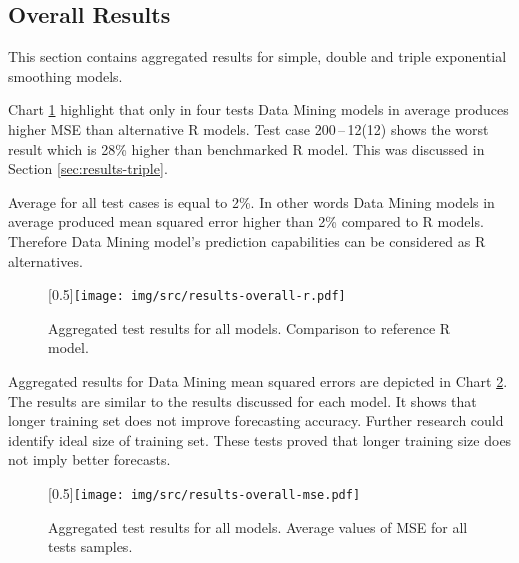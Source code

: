         \subsection{Overall Results} \label{sec:overall}
        This section contains aggregated results for simple, double and triple exponential smoothing models.

        Chart \ref{img:results-overall-r} highlight that only in four tests Data Mining models in average produces
        higher MSE than alternative R models. Test case 200\,--\,12(12) shows the worst result which is 28\%
        higher than benchmarked R model. This was discussed in Section \ref{sec:results-triple}.

        Average for all test cases is equal to 2\%. In other words Data Mining models in average produced mean
        squared error higher than 2\% compared to R models. Therefore Data Mining model's prediction capabilities
        can be considered as R alternatives.

        \begin{figure}[H]
            \begin{center}
                \scalebox{0.65}[0.5]{\texttt{[image: img/src/results-overall-r.pdf]}}
                \caption{Aggregated test results for all models. Comparison to reference R model.}
                \label{img:results-overall-r}
            \end{center}
        \end{figure}

        Aggregated results for Data Mining mean squared errors are depicted in Chart \ref{img:results-overall-mse}. The
        results are similar to the results discussed for each model. It shows that longer training set does not
        improve forecasting accuracy. Further research could identify ideal size of training set. These tests
        proved that longer training size does not imply better forecasts.

        \begin{figure}[H]
            \begin{center}
                \scalebox{0.65}[0.5]{\texttt{[image: img/src/results-overall-mse.pdf]}}
                \caption{Aggregated test results for all models. Average values of MSE for all tests samples.}
                \label{img:results-overall-mse}
            \end{center}
        \end{figure}

